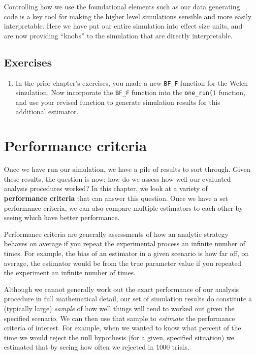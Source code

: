 \documentclass[
]{book}
\providecommand{\tightlist}{%
  \setlength{\itemsep}{0pt}\setlength{\parskip}{0pt}}
\begin{document}
Controlling how we use the foundational elements such as our data generating code is a key tool for making the higher level simulations sensible and more easily interpretable.
Here we have put our entire simulation into effect size units, and are now providing ``knobs'' to the simulation that are directly interpretable.

\section{Exercises}\label{exercises-5}

\begin{enumerate}
\def\labelenumi{\arabic{enumi}.}
\tightlist
\item
  In the prior chapter's exercises, you made a new \texttt{BF\_F} function for the Welch simulation. Now incorporate the \texttt{BF\_F} function into the \texttt{one\_run()} function, and use your revised function to generate simulation results for this additional estimator.
\end{enumerate}

\chapter{Performance criteria}\label{performance-criteria}

Once we have run our simulation, we have a pile of results to sort through.
Given these results, the question is now: how do we assess how well our evaluated analysis procedures worked? In this chapter, we look at a variety of \textbf{performance criteria} that can answer this question. Once we have a set performance criteria, we can also compare multiple estimators to each other by seeing which have better performance.

Performance criteria are generally assessments of how an analytic strategy behaves on average if you repeat the experimental process an infinite number of times.
For example, the bias of an estimator in a given scenario is how far off, on average, the estimator would be from the true parameter value if you repeated the experiment an infinite number of times.

Although we cannot generally work out the exact performance of our analysis procedure in full mathematical detail, our set of simulation results do constitute a (typically large) \emph{sample} of how well things will tend to worked out given the specified scenario.
We can then use that sample to \emph{estimate} the performance criteria of interest.
For example, when we wanted to know what percent of the time we would reject the null hypothesis (for a given, specified situation) we estimated that by seeing how often we rejected in 1000 trials.
\end{document}
